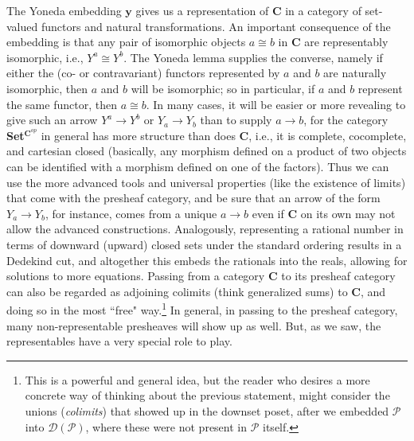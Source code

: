 \documentclass[11pt]{book}
\theoremstyle{definition}
\theoremstyle{definition}
\theoremstyle{definition}
\theoremstyle{theorem}
\theoremstyle{definition}
\begin{document}
The Yoneda embedding $\textbf{y}$ gives us a representation of \textbf{C} in a category of set-valued functors and natural transformations. An important consequence of the embedding is that any pair of isomorphic objects $a \cong b$ in \textbf{C} are representably isomorphic, i.e., $Y^a \cong Y^b$. The Yoneda lemma supplies the converse, namely if either the (co- or contravariant) functors represented by $a$ and $b$ are naturally isomorphic, then $a$ and $b$ will be isomorphic; so in particular, if $a$ and $b$ represent the same functor, then $a \cong b$. In many cases, it will be easier or more revealing to give such an arrow $Y^a \rightarrow Y^b$ or $Y_a \rightarrow Y_b$ than to supply $a \rightarrow b$, for the category \textbf{Set}$^{\textbf{C}^{op}}$ in general has more structure than does \textbf{C}, i.e., it is complete, cocomplete, and cartesian closed (basically, any morphism defined on a product of two objects can be identified with a morphism defined on one of the factors). Thus we can use the more advanced tools and universal properties (like the existence of limits) that come with the presheaf category, and be sure that an arrow of the form $Y_a \rightarrow Y_b$, for instance, comes from a unique $a \rightarrow b$ even if \textbf{C} on its own may not allow the advanced constructions. Analogously, representing a rational number in terms of downward (upward) closed sets under the standard ordering results in a Dedekind cut, and altogether this embeds the rationals into the reals, allowing for solutions to more equations. Passing from a category \textbf{C} to its presheaf category can also be regarded as adjoining colimits (think generalized sums) to \textbf{C}, and doing so in the most ``free" way.\footnote{This is a powerful and general idea, but the reader who desires a more concrete way of thinking about the previous statement, might consider the unions (\textit{colimits}) that showed up in the downset poset, after we embedded $\mathcal{P}$ into $\mathcal{D}(\mathcal{P})$, where these were not present in $\mathcal{P}$ itself.} In general, in passing to the presheaf category, many non-representable presheaves will show up as well. But, as we saw, the representables have a very special role to play.  
\end{document}
